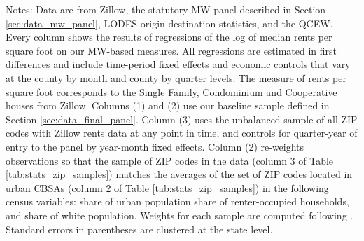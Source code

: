 \begin{table}[hbt!]
    \begin{minipage}{.95\linewidth} \footnotesize
        \vspace{2mm}
        Notes:
        Data are from Zillow,
        the statutory MW panel described in Section \ref{sec:data_mw_panel},
        LODES origin-destination statistics, and the QCEW.
        Every column shows the results of regressions of the log of
        median rents per square foot on our MW-based measures.
        All regressions are estimated in first differences and include 
        time-period fixed effects and economic controls that vary at the 
        county by month and county by quarter levels.
        The measure of rents per square foot corresponds to the Single Family, 
        Condominium and Cooperative houses from Zillow.
        Columns (1) and (2) use our baseline sample defined in Section 
        \ref{sec:data_final_panel}.
        Column (3) uses the unbalanced sample of all ZIP codes with 
        Zillow rents data at any point in time, and controls for quarter-year 
        of entry to the panel by year-month fixed effects.
        Column (2) re-weights observations so that the sample of 
        ZIP codes in the data (column 3 of Table \ref{tab:stats_zip_samples}) 
        matches the averages of the set of ZIP codes located in urban CBSAs 
        (column 2 of Table \ref{tab:stats_zip_samples})
        in the following census variables:
        share of urban population
        share of renter-occupied households, and
        share of white population.
        Weights for each sample are computed following \textcite{Hainmueller2012}.
        Standard errors in parentheses are clustered at the state level.
    \end{minipage}
\end{table}

